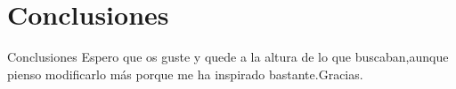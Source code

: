 \section{Conclusiones}
\begin{frame}
  \begin {center}
  \begin{block}{Conclusiones}
    Espero que os guste y quede a la  altura de lo que buscaban,aunque pienso
  modificarlo  más porque me ha inspirado bastante.Gracias.
  \end{block}
  \end{center}
\end{frame}
